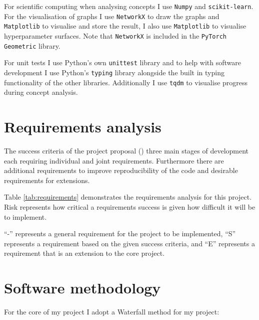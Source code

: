For scientific computing when analysing concepts I use \texttt{Numpy} and \texttt{scikit-learn}\cite{scikit-learn}. For the visualisation of graphs I use \texttt{NetworkX}\cite{SciPyProceedings_11} to draw the graphs and \texttt{Matplotlib}\cite{Hunter:2007} to visualise and store the result, I also use \texttt{Matplotlib} to visualise hyperparameter surfaces. Note that \texttt{NetworkX} is included in the \texttt{PyTorch Geometric} library.

For unit tests I use Python's own \texttt{unittest} library and to help with software development I use Python's \texttt{typing} library alongside the built in typing functionality of the other libraries. Additionally I use \texttt{tqdm}\cite{casper_da_costa_luis_2023_7697295} to visualise progress during concept analysis.

\section{Requirements analysis}


The success criteria of the project proposal () three main stages of development each requiring individual and joint requirements.
Furthermore there are additional requirements to improve reproducibility of the code and desirable requirements for extensions.

Table \ref{tab:requirements} demonstrates the requirements analysis for this project.
Risk represents how critical a requirements success is given how difficult it will be to implement.

``-'' represents a general requirement for the project to be implemented, ``S'' represents a requirement based on the given success criteria, and ``E'' represents a requirement that is an extension to the core project.



\section{Software methodology}


For the core of my project I adopt a Waterfall method \cite{royce1970managing} for my project:


